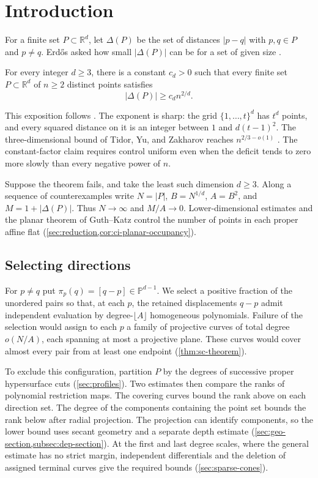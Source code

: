\section{Introduction}\label{sec:introduction}

For a finite set $P\subset\mathbb{R}^d$, let $\Delta(P)$ be the set of distances $|p-q|$ with $p,q\in P$ and $p\ne q$. Erd\H{o}s asked how small $|\Delta(P)|$ can be for a set of given size \cite{erdos1946}.

\begin{maintheorem}\label{thm:main}
For every integer $d\ge3$, there is a constant $c_d>0$ such that every finite set $P\subset\mathbb{R}^d$ of $n\ge2$ distinct points satisfies
\[
 |\Delta(P)|\ge c_d n^{2/d}.
\]
\end{maintheorem}

This exposition follows \cite{OpenAIMathSource}. The exponent is sharp: the grid $\{1,\ldots,t\}^d$ has $t^d$ points, and every squared distance on it is an integer between $1$ and $d(t-1)^2$. The three-dimensional bound of Tidor, Yu, and Zakharov reaches $n^{2/3-o(1)}$ \cite[Theorem~1.1]{tidoryuzakharov2026}. The constant-factor claim requires control uniform even when the deficit tends to zero more slowly than every negative power of $n$.

Suppose the theorem fails, and take the least such dimension $d\geq3$. Along a sequence of counterexamples write $N=|P|$, $B=N^{1/d}$, $A=B^2$, and $M=1+|\Delta(P)|$. Thus $N\to\infty$ and $M/A\to0$. Lower-dimensional estimates and the planar theorem of Guth--Katz control the number of points in each proper affine flat (\cref{sec:reduction,cor:ci-planar-occupancy}).

\subsection{Selecting directions}

For $p\ne q$ put $\pi_p(q)=[q-p]\in\mathbb{P}^{d-1}$. We select a positive fraction of the unordered pairs so that, at each $p$, the retained displacements $q-p$ admit independent evaluation by degree-$\lfloor A\rfloor$ homogeneous polynomials. Failure of the selection would assign to each $p$ a family of projective curves of total degree $o(N/A)$, each spanning at most a projective plane. These curves would cover almost every pair from at least one endpoint (\cref{thm:sc-theorem}).

To exclude this configuration, partition $P$ by the degrees of successive proper hypersurface cuts (\cref{sec:profiles}). Two estimates then compare the ranks of polynomial restriction maps. The covering curves bound the rank above on each direction set. The degree of the components containing the point set bounds the rank below after radial projection. The projection can identify components, so the lower bound uses secant geometry and a separate depth estimate (\cref{sec:geo-section,subsec:dep-section}). At the first and last degree scales, where the general estimate has no strict margin, independent differentials and the deletion of assigned terminal curves give the required bounds (\cref{sec:sparse-cones}).

